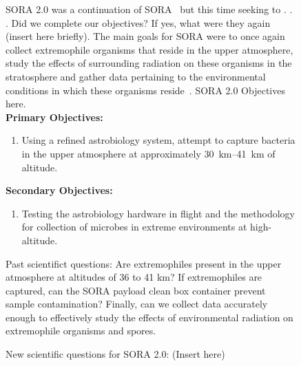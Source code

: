 \begin{figure}[h!]
\begin{center}
SORA 2.0 was a continuation of SORA~\cite{SORA} but this time seeking to . . .
Did we complete our objectives?  If yes, what were they again (insert here briefly).  
The main goals for SORA were to once again collect extremophile organisms that reside in the upper atmosphere, study the effects of surrounding radiation on these organisms in the stratosphere and gather data pertaining to the environmental conditions in which these organisms reside~\cite{SORA}.  
SORA 2.0 Objectives here.\\
{\bf Primary Objectives:}
	\begin{enumerate}
	\item Using a refined astrobiology system, attempt to capture bacteria in the upper atmosphere at approximately \SIrange{30}{41}{\kilo\meter} of altitude.
	\end{enumerate}
{\bf Secondary Objectives:}
	\begin{enumerate}
	\item Testing the astrobiology hardware in flight and the methodology for collection of microbes in extreme environments at high-altitude.
	\end{enumerate}

Past scientifict questions:
 Are extremophiles present in the upper atmosphere at altitudes of 36 to 41 km?  If extremophiles are captured, can the SORA payload clean box container prevent sample contamination? Finally, can we collect data accurately enough to effectively study the effects of environmental radiation on extremophile organisms and spores.
 
 New scientific questions for SORA 2.0:
(Insert here)


\end{center}
\end{figure}
